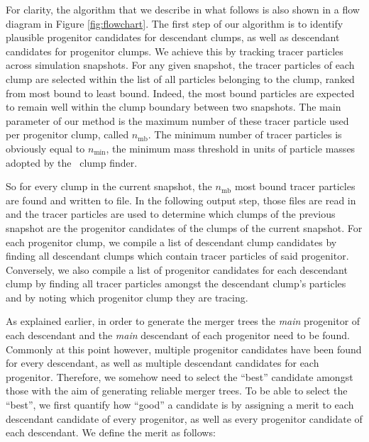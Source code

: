 For clarity, the algorithm that we describe in what follows
is also shown in a flow diagram in Figure \ref{fig:flowchart}.
The first step of our algorithm is to identify plausible progenitor
candidates for descendant clumps, as well as descendant candidates for progenitor clumps. We achieve this by tracking tracer particles
across simulation snapshots. For any given snapshot, the tracer particles
of each clump are selected within the list of all particles belonging to
the clump, ranked from most bound to least bound. Indeed, the most bound particles are expected to remain well within the clump boundary between
two snapshots. The main parameter of our method is the maximum number of
these tracer particle used per progenitor clump, called $n_{\mathrm{mb}}$. The minimum number of
tracer particles is obviously equal to $n_{\mathrm{min}}$, the minimum mass threshold in units of
particle masses adopted by the \phew\ clump finder.

So for every clump in the current snapshot, the $n_{\mathrm{mb}}$
most bound tracer particles are found and written to file. In the following
output step, those files are read in and the tracer particles
are used to determine which clumps of the previous snapshot are the
progenitor candidates of the clumps of the current snapshot.
For each progenitor clump, we compile a list of descendant clump candidates by finding all
descendant clumps which contain tracer particles of said progenitor. Conversely, we also compile a
list of progenitor candidates for each descendant clump by finding all tracer particles amongst the
descendant clump's particles and by noting which progenitor clump they are tracing.

As explained earlier, in order to generate the merger trees the \textit{main} progenitor of each
descendant and the \textit{main} descendant of each progenitor need to be found. Commonly at this
point however, multiple progenitor candidates have been found for every descendant, as well as
multiple descendant candidates for each progenitor. Therefore, we somehow need to select the
``best'' candidate amongst those with the aim of generating reliable merger trees. To be able to
select the ``best'', we first quantify how ``good'' a candidate is by assigning a merit to each
descendant candidate of every progenitor, as well as every progenitor candidate of each descendant.
We define the merit as follows:


